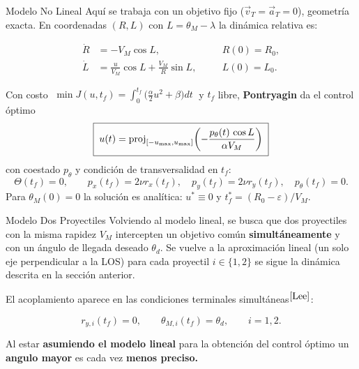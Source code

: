 \begin{block}{Modelo No Lineal}
	Aquí se trabaja con un objetivo fijo ($\vec v_T=\vec a_T=0$), geometría exacta. En coordenadas 
	$(R,L)$ con $L=\theta_M-\lambda$ la dinámica relativa es:
	
	\vspace{-0.9cm}
	$$
	\begin{aligned}
	\dot R&= -V_M\cos L, &\quad& R(0)=R_0,\\
	\dot L&= \frac{u}{V_M}\cos L+\frac{V_M}{R}\sin L, &\quad& L(0)=L_0.
	\end{aligned}
	$$

	\vspace{1.5cm}
	
	\begin{exampleblock}{}
	Con costo $\;\min J(u,t_f)=\int_0^{t_f}\!\big(\tfrac{\alpha}{2}u^2+\beta\big)dt\;$ 
	y $t_f$ libre, \textbf{Pontryagin} da el control óptimo
	$$
	\boxed{\;\vphantom{\frac{\frac{A}{B}}{\frac{C}{D}}}
	u(t)=\operatorname{proj}_{[-u_{\max},u_{\max}]}
	\!\left(-\frac{p_\theta(t)\,\cos L}{\alpha V_M}\right)\;}
	$$
	con coestado $p_\theta$ y condición de transversalidad en $t_f$:
	$$
	\Theta(t_f)=0,\qquad p_x(t_f)=2\nu r_x(t_f),\quad p_y(t_f)=2\nu r_y(t_f),\quad p_\theta(t_f)=0.
	$$
	Para $\theta_M(0)=0$ la solución es analítica: $u^*\equiv0$ y 
	$t_f^*=(R_0-\varepsilon)/V_M$.
	\end{exampleblock}
	{\def\marginimagetop{-2}
	}
\end{block}

\separatorcolumn

\begin{block}{Modelo Dos Proyectiles}
	Volviendo al modelo lineal, se busca que dos proyectiles con la misma rapidez $V_M$ intercepten un objetivo 
	común \textbf{simultáneamente} y con un ángulo de llegada deseado $\theta_d$. 
	Se vuelve a la aproximación lineal (un solo eje perpendicular a la LOS) para 
	cada proyectil $i\in\{1,2\}$ se sigue la dinámica descrita en la sección anterior.

	
	El acoplamiento aparece en las condiciones terminales simultáneas$^{\cite{Lee}}$:

	\vspace{-0.9cm}
	$$
	r_{y,i}(t_f)=0,\qquad \theta_{M,i}(t_f)=\theta_d,\qquad i=1,2.
	$$

	Al estar \textbf{asumiendo el modelo lineal} para la obtención del control óptimo un \textbf{angulo 
	mayor} es cada vez \textbf{menos preciso.} 

	{\def\marginimagetop{-1}
	}

\end{block}

